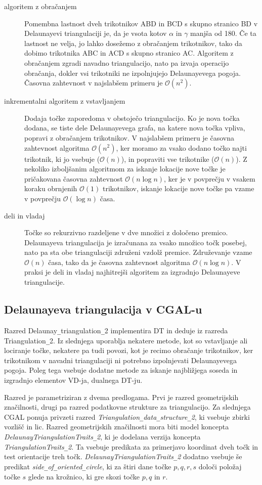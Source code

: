 \documentclass[a4paper, 12pt]{book}
\newcommand{\OO}{\ensuremath{\mathcal{O}}} %
\newcommand{\U}{\texttt{\_}}
\begin{document}
\begin{description}
\item[algoritem z obračanjem] Pomembna lastnost dveh trikotnikov ABD in BCD s skupno stranico BD v Delaunayevi triangulaciji je, da je vsota kotov $\alpha$ in $\gamma$ manjša od 180\textdegree. Če ta lastnost ne velja, jo lahko dosežemo z obračanjem trikotnikov, tako da dobimo trikotnika ABC in ACD s skupno stranico AC. Algoritem z obračanjem zgradi navadno triangulacijo, nato pa izvaja operacijo obračanja, dokler vsi trikotniki ne izpolnjujejo Delaunayevega pogoja. Časovna zahtevnost v najslabšem primeru je $\OO(n^2)$.
\item[inkrementalni algoritem z vstavljanjem] Dodaja točke zaporedoma v obstoječo triangulacijo. Ko je nova točka dodana, se tiste dele Delaunayevega grafa, na katere nova točka vpliva, popravi z obračanjem trikotnikov. V najslabšem primeru je časovna zahtevnost algoritma $\OO(n^2)$, ker moramo za vsako dodano točko najti trikotnik, ki jo vsebuje ($\OO(n)$), in popraviti vse trikotnike ($\OO(n)$). Z nekoliko izboljšanim algoritmom za iskanje lokacije nove točke je pričakovana časovna zahtevnost $\OO(n\log n)$, ker je v povprečju v vsakem koraku obrnjenih $\OO(1)$ trikotnikov, iskanje lokacije nove točke pa vzame v povprečju $\OO(\log n)$ časa.
\item[deli in vladaj] Točke so rekurzivno razdeljene v dve množici z določeno premico. Delaunayeva triangulacija je izračunana za vsako množico točk posebej, nato pa sta obe triangulaciji združeni vzdolž premice. Združevanje vzame $\OO(n)$ časa, tako da je časovna zahtevnost algoritma $\OO(n\log n)$. V praksi je deli in vladaj najhitrejši algoritem za izgradnjo Delaunayeve triangulacije.
\end{description}

\subsection{Delaunayeva triangulacija v CGAL-u}
Razred Delaunay\U triangulation\U 2 implementira DT in deduje iz razreda Triangulation\U 2. Iz slednjega uporablja nekatere metode, kot so vstavljanje ali lociranje točke, nekatere pa tudi povozi, kot je recimo obračanje trikotnikov, ker trikotnikom v navadni triangulaciji ni potrebno izpolnjevati Delaunayevega pogoja. Poleg tega vsebuje dodatne metode za iskanje najbližjega soseda in izgradnjo elementov VD-ja, dualnega DT-ju.

Razred je parametriziran z dvema predlogama. Prvi je razred geometrijskih značilnosti, drugi pa razred podatkovne strukture za triangulacijo. Za slednjega CGAL ponuja privzeti razred \textit{ Triangulation\U data\U structure\U 2}, ki vsebuje zbirki vozlišč in lic. Razred geometrijskih značilnosti mora biti model koncepta \textit{DelaunayTriangulationTraits\U 2}, ki je dodelana verzija koncepta \textit{TriangulationTraits\U 2}. Ta vsebuje predikata za primerjavo koordinat dveh točk in test orientacije treh točk. \textit{DelaunayTriangulationTraits\U 2} dodatno vsebuje še predikat \textit{side\U of\U oriented\U circle}, ki za štiri dane točke $p, q, r, s$ določi položaj točke $s$ glede na krožnico, ki gre skozi točke $p, q$ in $r$.
\end{document}
